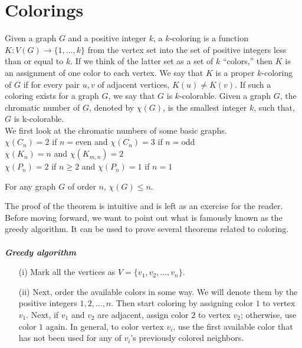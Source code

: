 \chapter{Colorings}

Given a graph $G$ and a positive integer $k$, a $k$-coloring is a function $K : V (G) \to \{1,...,k\}$ from the vertex set into the set of positive integers less than or equal to $k$. If we think of the latter set as a set of $k$ “colors,” then $K$ is an assignment of one color to each vertex. We say that $K$ is a proper $k$-coloring of $G$ if for every pair $u,v$ of adjacent vertices, $K(u) \neq K(v)$. If such a coloring exists for a graph $G$, we say that $G$ is $k$-colorable. Given a graph $G$, the chromatic number of $G$, denoted by $\chi(G)$, is the smallest integer $k$, such that, $G$ is k-colorable.\\
We first look at the chromatic numbers of some basic graphs.\\
$\chi(C_n)=2$ if $n=$even and $\chi(C_n)=3$ if $n=$odd\\
$\chi(K_n)=n$ and $\chi(K_{m,n})=2$\\
$\chi(P_n)=2$ if $n \ge 2$ and $\chi(P_n)=1$ if $n=1$\\

\begin{thm}
    For any graph $G$ of order $n$, $\chi(G) \le n$. 
\end{thm}
The proof of the theorem is intuitive and is left as an exercise for the reader.\\
Before moving forward, we want to point out what is famously known as the greedy algorithm. It can be used to prove several theorems related to coloring.\\
\\
\textbf{\em{Greedy algorithm}}
\begin{enumerate}
    \item[(i)] Mark all the vertices as $V=\{v_1, v_2, \dots, v_n\}$.
    \item[(ii)] Next, order the available colors in some way. We will denote them by the positive integers $1,2,\dots,n$. Then start coloring by assigning color $1$ to vertex $v_1$. Next, if $v_1$ and $v_2$ are adjacent, assign color $2$ to vertex $v_2$; otherwise, use color $1$ again. In general, to color vertex $v_i$, use the first available color that has not been used for any of $v_i$'s previously colored neighbors.
\end{enumerate}

